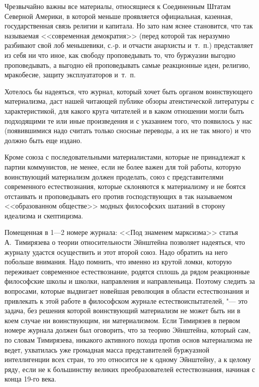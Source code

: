 Чрезвычайно важны все материалы, относящиеся к Соединенным Штатам Северной
Америки, в которой меньше проявляется официальная, казенная,
государственная связь религии и капитала. Но зато нам яснее становится, что
так называемая <<современная демократия>> (перед которой так неразумно
разбивают свой лоб меньшевики, с.-р. и отчасти анархисты и~т.~п.)
представляет из себя ни что иное, как свободу проповедывать то, что
буржуазии выгодно проповедывать, а выгодно ей проповедывать самые
реакционные идеи, религию, мракобесие, защиту эксплуататоров и~т.~п.

Хотелось бы надеяться, что журнал, который хочет быть органом воинствующего
материализма, даст нашей читающей публике обзоры атеистической литературы с
характеристикой, для какого круга читателей и в каком отношении могли быть
подходящими те или иные произведения и с указанием того, что появилось у
нас (появившимися надо считать только сносные переводы, а их не так много)
и что должно быть еще издано.

Кроме союза с последовательными материалистами, которые не принадлежат к
партии коммунистов, не менее, если не более важен для той работы, которую
воинствующий материализм должен проделать, союз с представителями
современного естествознания, которые склоняются к материализму и не боятся
отстаивать и проповедывать его против господствующих в так называемом
<<образованном обществе>> модных философских шатаний в сторону идеализма и
скептицизма.

Помещенная в 1---2 номере журнала: <<Под знаменем марксизма>> статья
А.~Тимирязева о теории относительности Эйнштейна
позволяет надеяться, что журналу удастся осуществить и этот второй союз.
Надо обратить на него побольше внимания. Надо помнить, что именно из крутой
ломки, которую переживает современное естествознание, родятся сплошь да
рядом реакционные философские школы и школки, направления и направленьица.
Поэтому следить за вопросами, которые выдвигает новейшая революция в
области естествознания и привлекать к этой работе в философском журнале
естествоиспытателей, "--- это задача, без решения которой воинствующий
материализм не может быть ни в коем случае ни воинствующим, ни
материализмом. Если Тимирязев в первом номере журнала должен был оговорить,
что за теорию Эйнштейна, который сам, по словам Тимирязева, никакого
активного похода против основ материализма не ведет, ухватилась уже
громадная масса представителей буржуазной интеллигенции всех стран, то это
относится не к одному Эйнштейну, а к целому ряду, если не к большинству
великих преобразователей естествознания, начиная с конца 19-го века.

